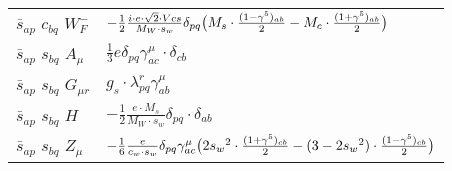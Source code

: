 \begin{center}
\begin{tabular}{|l|l|}
$\bar{s}{}_{a p }$ \phantom{-} $c{}_{b q }$ \phantom{-} $W^-_F{}_{}$ \phantom{-}  &
	$-\frac{1}{2}\frac{ i \cdot e \cdot\sqrt{2} \cdot Vcs}{ M_W \cdot s_w}\delta_{p q} \big( M_s\cdot {(1-\gamma^5)_{a b}\over 2} - M_c\cdot {(1+\gamma^5)_{a b}\over 2} \big)$\\[2mm]
$\bar{s}{}_{a p }$ \phantom{-} $s{}_{b q }$ \phantom{-} ${A}_{\mu }$ \phantom{-}  &
	$\frac{1}{3} e\delta_{p q} \gamma_{a c}^\mu \cdot \delta_{c b} $\\[2mm]
$\bar{s}{}_{a p }$ \phantom{-} $s{}_{b q }$ \phantom{-} ${G}_{\mu r }$ \phantom{-}  &
	$ g_s\cdot \lambda_{p q}^r \gamma_{a b}^\mu $\\[2mm]
$\bar{s}{}_{a p }$ \phantom{-} $s{}_{b q }$ \phantom{-} ${H}_{}$ \phantom{-}  &
	$-\frac{1}{2}\frac{ e \cdot M_s}{ M_W \cdot s_w}\delta_{p q} \cdot \delta_{a b} $\\[2mm]
$\bar{s}{}_{a p }$ \phantom{-} $s{}_{b q }$ \phantom{-} ${Z}_{\mu }$ \phantom{-}  &
	$-\frac{1}{6}\frac{ e}{ c_w \cdot s_w}\delta_{p q} \gamma_{a c}^\mu \big(2 s_w{}^2 \cdot {(1+\gamma^5)_{c b}\over 2} - (3-2 s_w {}^2)\cdot {(1-\gamma^5)_{c b}\over 2} \big)$\\ \hline
\end{tabular}


\end{center}
